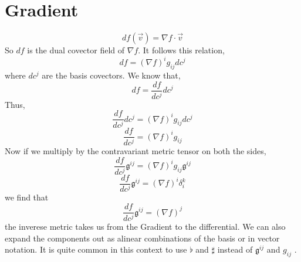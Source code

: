 \section{Gradient}
\begin{equation}
df(\vec{v}) = \nabla f \cdot \vec{v} 
\end{equation}
So $df$ is the dual covector field of $\nabla f$. It follows this relation,
\begin{equation}
df = (\nabla f)^{i} g_{ij}dc^{j} 
\end{equation}
where $dc^{j}$ are the basis covectors. We know that,
$$df = \frac{df}{dc^{j}}dc^{j}$$
Thus,
$$\frac{df}{dc^{j}}dc^{j} = (\nabla f)^{i} g_{ij}dc^{j}$$
\begin{equation}
	\frac{df}{dc^{j}} = (\nabla f)^{i} g_{ij}
\end{equation}
Now if we multiply by the contravariant metric tensor on both the sides,
$$\frac{df}{dc^{j}}\mathfrak{g}^{ij} = (\nabla f)^{i} g_{ij}\mathfrak{g}^{ij}$$
$$\frac{df}{dc^{j}}\mathfrak{g}^{ij} = (\nabla f)^{i} \delta^{k}_{i}$$
we find that
\begin{equation}
	\frac{df}{dc^{j}} \mathfrak{g}^{ij} = (\nabla f)^{j}
\end{equation}
the inverese metric takes us from the Gradient to the differential. We can also expand the components out as alinear combinations of the basis or in vector notation. It is quite common in this context to use $\flat$ and $\sharp$ instead of $\mathfrak{g}^{ij}$ and $g_{ij}$ .

